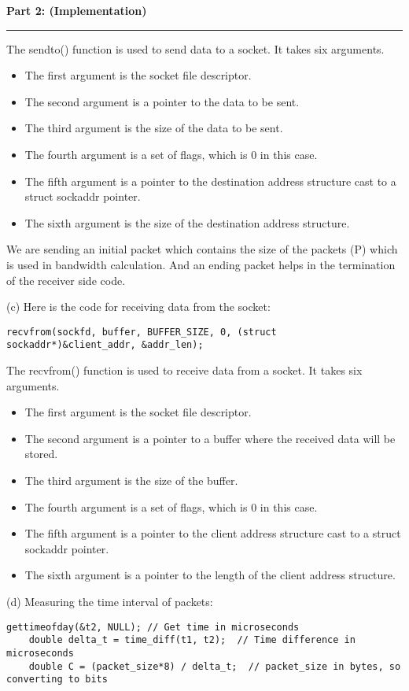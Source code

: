 \documentclass[a4paper,12pt]{article}
\newenvironment{solution}[2][]{%
    \begin{mdframed}[linecolor=blue!70!black, linewidth=2pt, roundcorner=10pt, backgroundcolor=yellow!10!white, skipabove=12pt, skipbelow=12pt]%
        \textbf{\large #2}
        \par\noindent\rule{\textwidth}{0.4pt}
}{
    \end{mdframed}
}
\begin{document}
\begin{solution}{Part 2: (Implementation)}
The sendto() function is used to send data to a socket. It takes six arguments. 
\begin{itemize}
    \item The first argument is the socket file descriptor.
    \item The second argument is a pointer to the data to be sent.
    \item The third argument is the size of the data to be sent.
    \item The fourth argument is a set of flags, which is 0 in this case.
    \item The fifth argument is a pointer to the destination address structure cast to a struct sockaddr pointer.
    \item The sixth argument is the size of the destination address structure.
\end{itemize}

We are sending an initial packet which contains the size of the packets (P) which is used in bandwidth calculation. And an ending packet helps in the termination of the receiver side code.


(c) Here is the code for receiving data from the socket:
\begin{lstlisting}[caption=Receiving Data from the Socket]
    recvfrom(sockfd, buffer, BUFFER_SIZE, 0, (struct sockaddr*)&client_addr, &addr_len);
\end{lstlisting}

The recvfrom() function is used to receive data from a socket. It takes six arguments.
\begin{itemize}
    \item The first argument is the socket file descriptor.
    \item The second argument is a pointer to a buffer where the received data will be stored.
    \item The third argument is the size of the buffer.
    \item The fourth argument is a set of flags, which is 0 in this case.
    \item The fifth argument is a pointer to the client address structure cast to a struct sockaddr pointer.
    \item The sixth argument is a pointer to the length of the client address structure.
\end{itemize}


(d) Measuring the time interval of packets:
\begin{lstlisting}[caption=Measuring the time interval of packets]
    gettimeofday(&t2, NULL); // Get time in microseconds
    double delta_t = time_diff(t1, t2);  // Time difference in microseconds
    double C = (packet_size*8) / delta_t;  // packet_size in bytes, so converting to bits
\end{lstlisting}


\end{solution}
\end{document}
